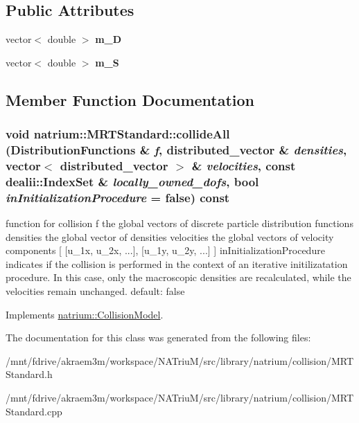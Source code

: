 \subsection*{Public Attributes}
\begin{DoxyCompactItemize}
\item 
\hypertarget{classnatrium_1_1MRTStandard_af4f768f5872b78fc4c6927b00629eb93}{
vector$<$ double $>$ {\bfseries m\_\-D}}
\label{classnatrium_1_1MRTStandard_af4f768f5872b78fc4c6927b00629eb93}

\item 
\hypertarget{classnatrium_1_1MRTStandard_ab50078f150ae9edae275773ecd850d18}{
vector$<$ double $>$ {\bfseries m\_\-S}}
\label{classnatrium_1_1MRTStandard_ab50078f150ae9edae275773ecd850d18}

\end{DoxyCompactItemize}


\subsection{Member Function Documentation}
\hypertarget{classnatrium_1_1MRTStandard_ae33b30f3080f8b933cf3b351092e8f09}{
\subsubsection[{collideAll}]{\setlength{\rightskip}{0pt plus 5cm}void natrium::MRTStandard::collideAll ({\bf DistributionFunctions} \& {\em f}, \/  {\bf distributed\_\-vector} \& {\em densities}, \/  vector$<$ {\bf distributed\_\-vector} $>$ \& {\em velocities}, \/  const dealii::IndexSet \& {\em locally\_\-owned\_\-dofs}, \/  bool {\em inInitializationProcedure} = {\ttfamily false}) const}}
\label{classnatrium_1_1MRTStandard_ae33b30f3080f8b933cf3b351092e8f09}


function for collision f the global vectors of discrete particle distribution functions densities the global vector of densities velocities the global vectors of velocity components \mbox{[} \mbox{[}u\_\-1x, u\_\-2x, ...\mbox{]}, \mbox{[}u\_\-1y, u\_\-2y, ...\mbox{]} \mbox{]} inInitializationProcedure indicates if the collision is performed in the context of an iterative initilizatation procedure. In this case, only the macroscopic densities are recalculated, while the velocities remain unchanged. default: false 

Implements \hyperlink{classnatrium_1_1CollisionModel}{natrium::CollisionModel}.

The documentation for this class was generated from the following files:\begin{DoxyCompactItemize}
\item 
/mnt/fdrive/akraem3m/workspace/NATriuM/src/library/natrium/collision/MRTStandard.h\item 
/mnt/fdrive/akraem3m/workspace/NATriuM/src/library/natrium/collision/MRTStandard.cpp\end{DoxyCompactItemize}
